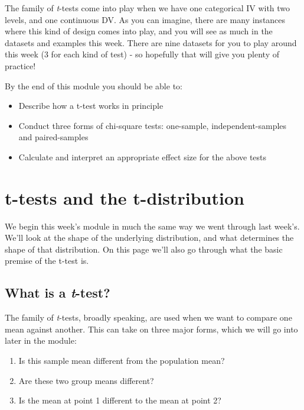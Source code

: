 \documentclass[
]{book}
\providecommand{\tightlist}{%
  \setlength{\itemsep}{0pt}\setlength{\parskip}{0pt}}
\begin{document}
The family of \emph{t}-tests come into play when we have one categorical IV with two levels, and one continuous DV. As you can imagine, there are many instances where this kind of design comes into play, and you will see as much in the datasets and examples this week. There are nine datasets for you to play around this week (3 for each kind of test) - so hopefully that will give you plenty of practice!

By the end of this module you should be able to:

\begin{itemize}
\tightlist
\item
  Describe how a t-test works in principle
\item
  Conduct three forms of chi-square tests: one-sample, independent-samples and paired-samples
\item
  Calculate and interpret an appropriate effect size for the above tests
\end{itemize}

\section{t-tests and the t-distribution}\label{t-tests-and-the-t-distribution}

We begin this week's module in much the same way we went through last week's. We'll look at the shape of the underlying distribution, and what determines the shape of that distribution. On this page we'll also go through what the basic premise of the t-test is.

\subsection{\texorpdfstring{What is a \emph{t}-test?}{What is a t-test?}}\label{what-is-a-t-test}

The family of \emph{t}-tests, broadly speaking, are used when we want to compare one mean against another. This can take on three major forms, which we will go into later in the module:

\begin{enumerate}
\def\labelenumi{\arabic{enumi}.}
\tightlist
\item
  Is this sample mean different from the population mean?
\item
  Are these two group means different?
\item
  Is the mean at point 1 different to the mean at point 2?
\end{enumerate}
\end{document}
